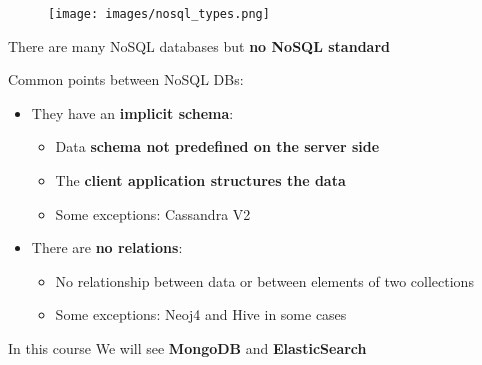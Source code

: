 \documentclass{beamer}[10pt, usepdftitle=false handout]
\begin{document}
	\begin{frame}
	
	\begin{figure}
	\texttt{[image: images/nosql\_types.png]} 
	
	\end{figure}	
	
	\end{frame}
	
	
	\begin{frame}
	
	There are many NoSQL databases but \textbf{no NoSQL standard}	
	\vspace*{0.6em}

	Common points between NoSQL DBs:
	\vspace*{0.6em}
	
	\begin{itemize}
	\item{They have an \textbf{implicit schema}:
		\begin{itemize}
			\item{Data \textbf{schema not predefined on the server side}}
			\item{The \textbf{client application structures the data}}
			\item{Some exceptions: Cassandra V2}
		\end{itemize}			
	}
	\item{There are \textbf{no relations}:
		\begin{itemize}
			\item{No relationship between data or between elements of two collections}
			\item{Some exceptions: Neoj4 and Hive in some cases}
		\end{itemize}				
	}		
	
	\end{itemize}

	\begin{block}{In this course}
	We will see \textbf{MongoDB} and \textbf{ElasticSearch}
	\end{block}
	
	\end{frame}	
	
\end{document}
